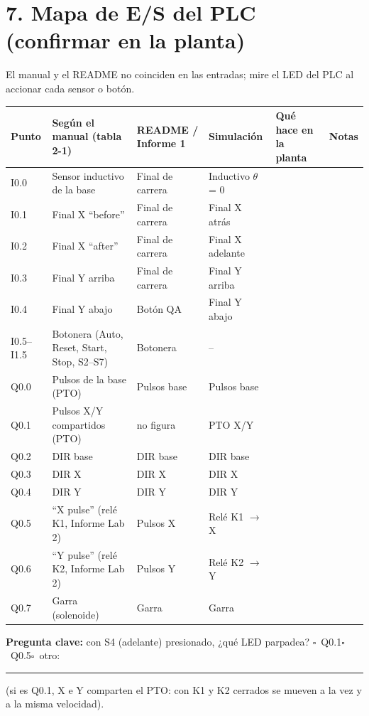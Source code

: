 \documentclass[10pt]{article}
\newcommand{\cajita}{$\square$}
\begin{document}
\section{7. Mapa de E/S del PLC (confirmar en la planta)}
El manual y el README no coinciden en las entradas; mire el LED del PLC al accionar cada sensor o botón.
{\small
\begin{longtable}{@{}L{1.4cm}L{5.2cm}L{3.6cm}L{3.4cm}>{}L{6.2cm}L{3.6cm}@{}}
\toprule
\textbf{Punto} & \textbf{Según el manual (tabla 2-1)} & \textbf{README / Informe 1} & \textbf{Simulación} & \textbf{Qué hace en la planta} & \textbf{Notas}\\
\midrule\endhead
\bottomrule\endfoot
I0.0 & Sensor inductivo de la base & Final de carrera & Inductivo $\theta$ = 0 & & \\
I0.1 & Final X ``before'' & Final de carrera & Final X atrás & & \\
I0.2 & Final X ``after'' & Final de carrera & Final X adelante & & \\
I0.3 & Final Y arriba & Final de carrera & Final Y arriba & & \\
I0.4 & Final Y abajo & Botón QA & Final Y abajo & & \\
I0.5--I1.5 & Botonera (Auto, Reset, Start, Stop, S2--S7) & Botonera & -- & & \\
Q0.0 & Pulsos de la base (PTO) & Pulsos base & Pulsos base & & \\
Q0.1 & Pulsos X/Y compartidos (PTO) & no figura & PTO X/Y & & \\
Q0.2 & DIR base & DIR base & DIR base & & \\
Q0.3 & DIR X & DIR X & DIR X & & \\
Q0.4 & DIR Y & DIR Y & DIR Y & & \\
Q0.5 & ``X pulse'' (relé K1, Informe Lab 2) & Pulsos X & Relé K1 $\rightarrow$ X & & \\
Q0.6 & ``Y pulse'' (relé K2, Informe Lab 2) & Pulsos Y & Relé K2 $\rightarrow$ Y & & \\
Q0.7 & Garra (solenoide) & Garra & Garra & & \\
\end{longtable}}
\noindent\textbf{Pregunta clave:} con S4 (adelante) presionado, ¿qué LED parpadea? \cajita\ Q0.1\quad \cajita\ Q0.5\quad \cajita\ otro: \rule{3cm}{0.4pt}
(si es Q0.1, X e Y comparten el PTO: con K1 y K2 cerrados se mueven a la vez y a la misma velocidad).

\newpage
\end{document}
